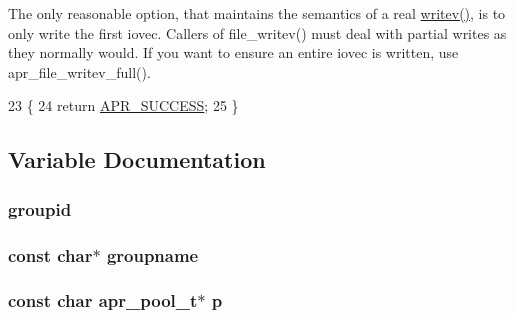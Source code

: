 The only reasonable option, that maintains the semantics of a real \hyperlink{apr__arch__os2calls_8h_a3d0f3996136a9b5ab46431c60c746efd}{writev()}, is to only write the first iovec. Callers of file\+\_\+writev() must deal with partial writes as they normally would. If you want to ensure an entire iovec is written, use apr\+\_\+file\+\_\+writev\+\_\+full().
\begin{DoxyCode}
23 \{
24     \textcolor{keywordflow}{return} \hyperlink{group__apr__errno_ga9ee311b7bf1c691dc521d721339ee2a6}{APR\_SUCCESS};
25 \}
\end{DoxyCode}


\subsection{Variable Documentation}
\subsubsection[{\texorpdfstring{groupid}{groupid}}]{ groupid}\hypertarget{group__apr__user_gae8cd66e6b22e7060cc6804a872e29446}{}\label{group__apr__user_gae8cd66e6b22e7060cc6804a872e29446}
\subsubsection[{\texorpdfstring{groupname}{groupname}}]{\setlength{\rightskip}{0pt plus 5cm}const char$\ast$ groupname}\hypertarget{group__apr__user_ga401185bb13a6f4bfeccd15a40ff2efcd}{}\label{group__apr__user_ga401185bb13a6f4bfeccd15a40ff2efcd}
\subsubsection[{\texorpdfstring{p}{p}}]{\setlength{\rightskip}{0pt plus 5cm}const char {\bf apr\+\_\+pool\+\_\+t}$\ast$ p}\hypertarget{group__apr__user_ga2b87ce5c0cd5c5aa97fd3ba98460ab16}{}\label{group__apr__user_ga2b87ce5c0cd5c5aa97fd3ba98460ab16}
